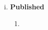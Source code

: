 
% 
 
\begin{enumerate}[i)]
\item  {\bf Published} %

\begin{enumerate}
\item 

\end{enumerate}

\end{enumerate}
